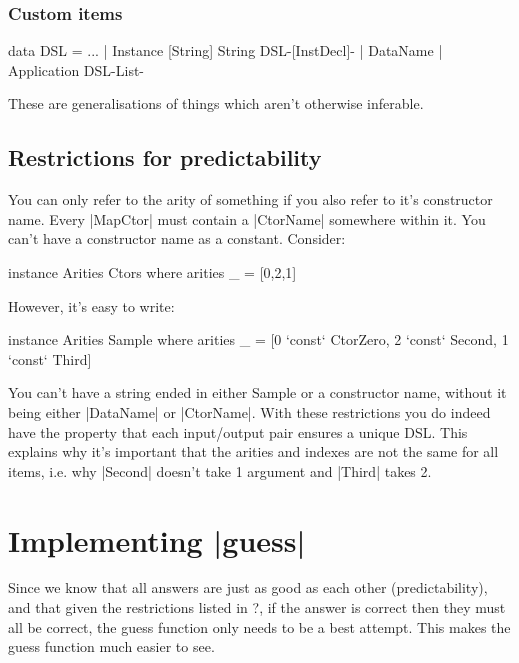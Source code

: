\documentclass[preprint]{sigplanconf}
\begin{document}
\subsubsection{Custom items}

\begin{code}
data DSL = ...
         | Instance [String] String DSL{-[InstDecl]-}
         | DataName
         | Application DSL{-List-}
\end{code}

These are generalisations of things which aren't otherwise inferable.



\subsection{Restrictions for predictability}

You can only refer to the arity of something if you also refer to it's constructor name. Every |MapCtor| must contain a |CtorName| somewhere within it. You can't have a constructor name as a constant. Consider:

\begin{code}
instance Arities Ctors where
    arities _ = [0,2,1]
\end{code}

However, it's easy to write:

\begin{code}
instance Arities Sample where
    arities _ = [0 `const` CtorZero{}, 2 `const` Second{}, 1 `const` Third{}]
\end{code}

You can't have a string ended in either Sample or a constructor name, without it being either |DataName| or |CtorName|.
With these restrictions you do indeed have the property that each input/output pair ensures a unique DSL. This explains why it's important that the arities and indexes are not the same for all items, i.e. why |Second| doesn't take 1 argument and |Third| takes 2.

\section{Implementing |guess|}

Since we know that all answers are just as good as each other (predictability), and that given the restrictions listed in ?, if the answer is correct then they must all be correct, the guess function only needs to be a best attempt. This makes the guess function much easier to see.
\end{document}
